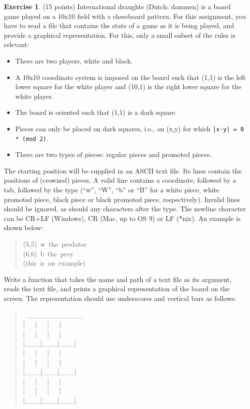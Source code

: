 \documentclass[11pt]{article}
\theoremstyle{definition}
\newtheorem{exercise}{Exercise}
\begin{document}
\begin{exercise}
	(15 points) International draughts (Dutch: dammen) is a board game played on a 10x10 field with a chessboard pattern. For this assignment, you have to	read a file that contains the state of a game as it is being played, and provide a graphical representation. For this, only a small subset of the rules is relevant:
	\begin{itemize}
		\setlength\itemsep{1mm}
		\item There are two players, white and black.
		\item A 10x10 coordinate system is imposed on the board such that (1,1)	is the left lower square for the white player and (10,1) is the	right lower square for the white player.
		\item The board is oriented such that (1,1) is a dark square.
		\item Pieces can only be placed on dark squares, i.e., on (x,y) for which \texttt{|x-y| = 0 * (mod 2)}.
		\item There are two types of pieces: regular pieces and promoted pieces.
	\end{itemize}
	
	\noindent The starting position will be supplied in an ASCII text file.  Its lines contain the positions of (crowned) pieces. A valid line contains a coordinate, followed by a tab, followed by the type (“w”, “W”, “b” or “B” for a white piece, white promoted piece, black piece or black promoted piece, respectively). Invalid lines should be ignored, as should any characters after the type. The newline character can be 	CR+LF (Windows), CR (Mac, up to OS 9) or LF (\textquotedbl{}*\textquotedbl{}nix). An example is	shown below:
	\begin{quote}{\ttfamily \raggedright \noindent
			(5,5)~w~the~predator\\
			(6,6)~b~the~prey\\
			(this~is~an~example)
		}
	\end{quote}
	Write a function that takes the name and path of a text file as	its argument, reads the text file, and prints a graphical representation of the board on the screen. The representation should use underscores and vertical bars as follows:
	\begin{quote}{\ttfamily \raggedright \noindent
			~\_\_\_\_\_\_\_\_\_\_\_\\
			|~~~|~~~|~~~|\\
			|~~~|~~~|~~~|\\
			|\_\_\_|\_\_\_|\_\_\_|\\
			|~~~|~~~|~~~|\\
			|~~~|~~~|~~~|\\
			|\_\_\_|\_\_\_|\_\_\_|\\
			|~~~|~~~|~~~|\\
			|~~~|~~~|~~~|\\
			|\_\_\_|\_\_\_|\_\_\_|
		}
	\end{quote}
	

\end{exercise}
\end{document}
